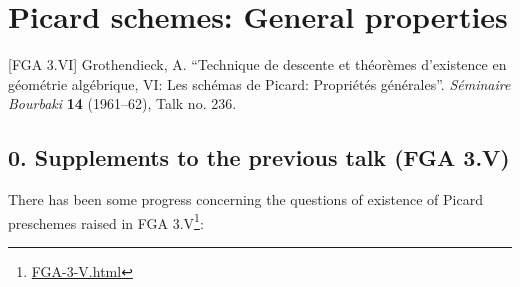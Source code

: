 \documentclass{article}
\renewcommand{\href}[2]{#2\footnote{\url{#1}}}
\newcommand{\oldpage}[1]{\marginpar{\footnotesize$\Big\vert$ \textit{p.~#1}}}
\theoremstyle{definition}
\theoremstyle{definition}
\theoremstyle{definition}
\theoremstyle{definition}
\theoremstyle{remark}
\begin{document}
\hypertarget{fga-3.vi}{%
\section{Picard schemes: General properties}\label{fga-3.vi}}

\providecommand{\scr}[1]{{\mathscr{#1}}}
\renewcommand{\cal}[1]{{\mathcal{#1}}}
\renewcommand{\frak}[1]{{\mathfrak{#1}}}
\renewcommand{\geq}{\geqslant}
\renewcommand{\leq}{\leqslant}

\providecommand{\Spec}{\operatorname{Spec}}
\providecommand{\red}{\mathrm{red}}
\providecommand{\Ga}{\operatorname{G_a}}
\providecommand{\Gm}{\operatorname{G_m}}
\providecommand{\HH}{\operatorname{HH}}
\providecommand{\Alb}{\operatorname{Alb}}

{[}FGA 3.VI{]}
Grothendieck, A.
``Technique de descente et théorèmes d'existence en géométrie algébrique, VI: Les schémas de Picard: Propriétés générales''.
\emph{Séminaire Bourbaki} \textbf{14} (1961--62), Talk no. 236.

\hypertarget{supplements-to-the-previous-talk-fga-3.v}{%
\subsection*{0. Supplements to the previous talk (FGA 3.V)}\label{supplements-to-the-previous-talk-fga-3.v}}

\oldpage{236-01}There has been some progress concerning the questions of existence of Picard preschemes raised in \href{FGA-3-V.html}{FGA 3.V}:
\end{document}
